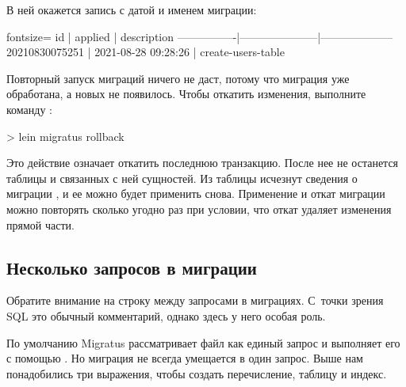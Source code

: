 В ней окажется запись с датой и именем миграции:


\begin{english}
  \begin{text*}{fontsize=\small}
         id     |       applied       |      description
----------------|---------------------|--------------------
 20210830075251 | 2021-08-28 09:28:26 | create-users-table
  \end{text*}
\end{english}

Повторный запуск миграций ничего не даст, потому что миграция  уже обработана, а новых не появилось. Чтобы откатить изменения, выполните команду :

\begin{english}
  \begin{clojure}
> lein migratus rollback
  \end{clojure}
\end{english}

Это действие означает откатить последнюю транзакцию. После нее не останется таблицы  и связанных с ней сущностей. Из таблицы  исчезнут сведения о миграции , и ее можно будет применить снова. Применение и откат миграции можно повторять сколько угодно раз при условии, что откат удаляет изменения прямой части.

\subsection{Несколько запросов в миграции}

Обратите внимание на строку \code{--;;} между запросами в миграциях. С~точки зрения SQL это обычный комментарий, однако здесь у него особая роль.

По умолчанию Migratus рассматривает файл как единый запрос и выполняет его с помощью . Но миграция не всегда умещается в один запрос.
Выше нам понадобились три выражения, чтобы создать перечисление, таблицу и индекс.

